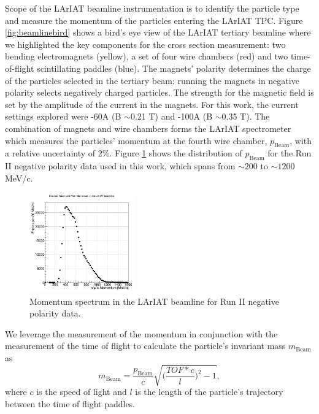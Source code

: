 \documentclass[aps,prl,twocolumn,showpacs,superscriptaddress,groupedaddress]{revtex4}  %
\begin{document}


Scope of the LArIAT beamline instrumentation is to identify the particle type and measure the momentum of the particles entering the LArIAT TPC. Figure \ref{fig:beamlinebird} shows a bird's eye view of the LArIAT tertiary beamline where we highlighted the key components for the cross section measurement:  two bending electromagnets (yellow), a set of four wire chambers (red) and two time-of-flight scintillating paddles (blue).  The magnets' polarity determines the charge of the particles selected in the tertiary beam: running the magnets in negative polarity selects negatively charged particles. The strength for the magnetic field is set by the amplitude of the current in the magnets. For this work,  the current settings explored were -60A (B $\sim$0.21 T) and -100A (B $\sim$0.35 T).  The combination of magnets and wire chambers forms the LArIAT spectrometer which measures the particles' momentum at the fourth wire chamber, $p_{\text{Beam}}$, with a relative uncertainty of 2\%. Figure \ref{fig:momentum} shows the distribution of  $p_{\text{Beam}}$ for the Run II negative polarity data used in this work, which spans from $\sim200$ to $\sim1200$ MeV/c. 
\begin{figure}
  \centering  
\includegraphics[width =0.4\textwidth]{momentumPiMuE.png}
\caption{Momentum spectrum in the LArIAT beamline  for Run II negative polarity data.}
\label{fig:momentum}
\end{figure}



We leverage the measurement of the momentum in conjunction with the measurement of the time of flight to calculate the particle's invariant mass $m_{\text{Beam}}$ as 
\begin{equation}
m_{\text{Beam}} = \frac{p_{\text{Beam}}}{c}\sqrt{\biggl(\frac{TOF*c}{l}\biggr)^2 -1},
\label{eq:mass}
\end{equation}
 where $c$ is the speed of light and $l$ is the length of the particle's trajectory between the time of flight paddles. 
\end{document}
